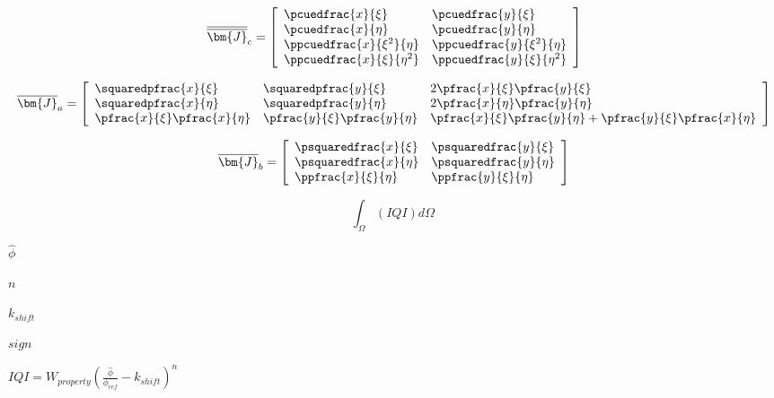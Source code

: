 \documentclass{article}
\begin{document}
\[ \begin{equation}\label{eqn:J_bar_bar_c_2D}

\overline{\overline{\bm{J}}}_c = 

\left[ 
\begin{array}{ll}
\pcuedfrac{x}{\xi} &
\pcuedfrac{y}{\xi}
\\
\pcuedfrac{x}{\eta} &
\pcuedfrac{y}{\eta} 
\\
\ppcuedfrac{x}{\xi^2}{\eta} &
\ppcuedfrac{y}{\xi^2}{\eta}
\\
\ppcuedfrac{x}{\xi}{\eta^2} &
\ppcuedfrac{y}{\xi}{\eta^2}
\end{array} 
\right]
\end{equation} \]
\pagebreak

\[ \begin{equation}\label{eqn:J_bar_a_2D}

\overline{\bm{J}}_a = 

\left[ 
\begin{array}{lll} 
\squaredpfrac{x}{\xi} &
\squaredpfrac{y}{\xi} &
2 \pfrac{x}{\xi} \pfrac{y}{\xi} 
\\
\squaredpfrac{x}{\eta} &
\squaredpfrac{y}{\eta} &
2 \pfrac{x}{\eta} \pfrac{y}{\eta}
\\
\pfrac{x}{\xi} \pfrac{x}{\eta} &
\pfrac{y}{\xi} \pfrac{y}{\eta} &
\pfrac{x}{\xi} \pfrac{y}{\eta} + \pfrac{y}{\xi} \pfrac{x}{\eta}
\end{array} 
\right]
\end{equation} \]
\pagebreak

\[ \begin{equation}\label{eqn:J_bar_b_2D}

\overline{\bm{J}}_b = 

\left[ 
\begin{array}{ll}
\psquaredfrac{x}{\xi} &
\psquaredfrac{y}{\xi}  
\\
\psquaredfrac{x}{\eta} &
\psquaredfrac{y}{\eta}
\\
\ppfrac{x}{\xi}{\eta} &
\ppfrac{y}{\xi}{\eta}
\end{array} 
\right]
\end{equation} \]
\pagebreak

\[ \int_{\Omega} (IQI) d \Omega\ \]
\pagebreak

$ \hat{\phi} $
\pagebreak

$ n $
\pagebreak

$ k_{shift} $
\pagebreak

$ sign $
\pagebreak

$ IQI = W_{property}( \frac {\hat{\phi}}{\phi_{ref}} - k_{shift} )^n $
\pagebreak
\end{document}
